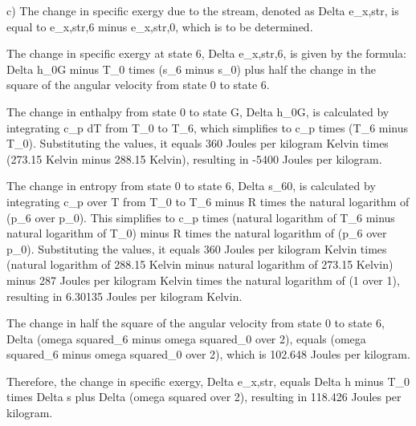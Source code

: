 c) The change in specific exergy due to the stream, denoted as Delta e_x,str, is equal to e_x,str,6 minus e_x,str,0, which is to be determined.

The change in specific exergy at state 6, Delta e_x,str,6, is given by the formula:
Delta h_0G minus T_0 times (s_6 minus s_0) plus half the change in the square of the angular velocity from state 0 to state 6.

The change in enthalpy from state 0 to state G, Delta h_0G, is calculated by integrating c_p dT from T_0 to T_6, which simplifies to c_p times (T_6 minus T_0). Substituting the values, it equals 360 Joules per kilogram Kelvin times (273.15 Kelvin minus 288.15 Kelvin), resulting in -5400 Joules per kilogram.

The change in entropy from state 0 to state 6, Delta s_60, is calculated by integrating c_p over T from T_0 to T_6 minus R times the natural logarithm of (p_6 over p_0). This simplifies to c_p times (natural logarithm of T_6 minus natural logarithm of T_0) minus R times the natural logarithm of (p_6 over p_0). Substituting the values, it equals 360 Joules per kilogram Kelvin times (natural logarithm of 288.15 Kelvin minus natural logarithm of 273.15 Kelvin) minus 287 Joules per kilogram Kelvin times the natural logarithm of (1 over 1), resulting in 6.30135 Joules per kilogram Kelvin.

The change in half the square of the angular velocity from state 0 to state 6, Delta (omega squared_6 minus omega squared_0 over 2), equals (omega squared_6 minus omega squared_0 over 2), which is 102.648 Joules per kilogram.

Therefore, the change in specific exergy, Delta e_x,str, equals Delta h minus T_0 times Delta s plus Delta (omega squared over 2), resulting in 118.426 Joules per kilogram.